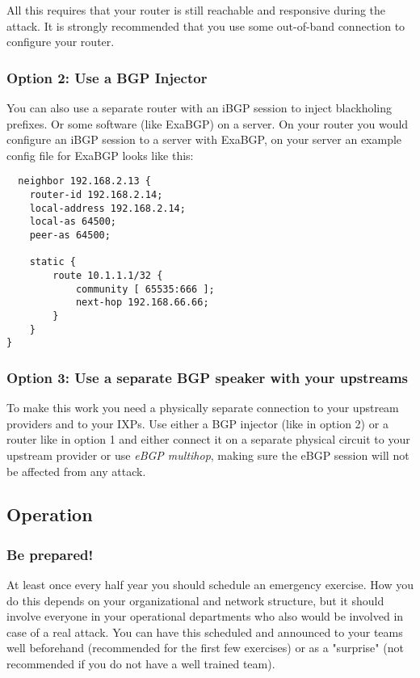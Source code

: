 All this requires that your router is still reachable and responsive during the attack. It is strongly recommended that you use some out-of-band connection to configure your router.

\subsubsection{Option 2: Use a BGP Injector}
You can also use a separate router with an iBGP session to inject blackholing prefixes. Or some software (like ExaBGP) on a server. On your router you would configure an iBGP session to a server with ExaBGP, on your server an example config file for ExaBGP looks like this:
\begin{verbatim}
  neighbor 192.168.2.13 {
    router-id 192.168.2.14;
    local-address 192.168.2.14;
    local-as 64500;
    peer-as 64500;

    static {
        route 10.1.1.1/32 {
            community [ 65535:666 ];
            next-hop 192.168.66.66;
        }
    }
}
\end{verbatim}

\subsubsection{Option 3: Use a separate BGP speaker with your upstreams}
To make this work you need a physically separate connection to your upstream providers and to your IXPs. Use either a BGP injector (like in option 2) or a router like in option 1 and either connect it on a separate physical circuit to your upstream provider or use \emph{eBGP multihop}, making sure the eBGP session will not be affected from any attack.

\subsection{Operation}
\subsubsection{Be prepared!}
At least once every half year you should schedule an emergency exercise. How you do this depends on your organizational and network structure, but it should involve everyone in your operational departments who also would be involved in case of a real attack. You can have this scheduled and announced to your teams well beforehand (recommended for the first few exercises) or as a "surprise" (not recommended if you do not have a well trained team).

